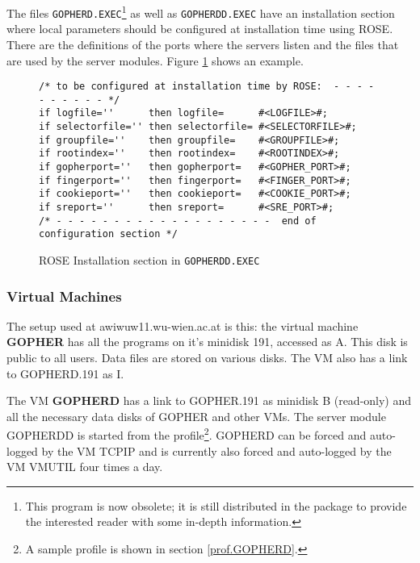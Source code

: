   The files {\tt GOPHERD.EXEC}\footnote{This program is now obsolete;
  it is still distributed in the package to provide the interested
  reader with some in-depth information.} as well as {\tt GOPHERDD.EXEC}
  have an installation
  section where local parameters should be configured at installation
  time using ROSE.
  There are the definitions of the ports where the servers listen
  and the files that are used by the server modules.
  Figure \ref{conf.gopherdd} shows an example.
 


\begin{figure}
\caption{ROSE Installation section in
{\tt GOPHERDD.EXEC}}\label{conf.gopherdd}
\rule{0mm}{2mm}
\begin{center}
\begin{small}
\begin{verbatim}
/* to be configured at installation time by ROSE:  - - - - - - - - - - */
if logfile=''      then logfile=      #<LOGFILE>#;
if selectorfile='' then selectorfile= #<SELECTORFILE>#;
if groupfile=''    then groupfile=    #<GROUPFILE>#;
if rootindex=''    then rootindex=    #<ROOTINDEX>#;
if gopherport=''   then gopherport=   #<GOPHER_PORT>#;
if fingerport=''   then fingerport=   #<FINGER_PORT>#;
if cookieport=''   then cookieport=   #<COOKIE_PORT>#;
if sreport=''      then sreport=      #<SRE_PORT>#;
/* - - - - - - - - - - - - - - - - - - -  end of configuration section */
\end{verbatim}
\end{small}
\end{center}
\rule{0mm}{2mm}
\end{figure}



\subsubsection{Virtual Machines}
  The setup used at {\sf awiwuw11.wu-wien.ac.at} is this:  
  the virtual machine {\bf GOPHER} has all the programs on it's minidisk 191,
  accessed as A.  This disk is public to all users.
  Data files are stored on various disks.
  The VM also has a link to GOPHERD.191 as I.

  The VM {\bf GOPHERD} has a link to GOPHER.191 as minidisk B (read-only)
  and all the necessary data disks of GOPHER and other VMs.
  The server module GOPHERDD is started from the profile\footnote{A sample
  profile is shown in section \ref{prof.GOPHERD}.}.  GOPHERD can be forced
  and auto-logged by the VM TCPIP and is currently also forced and
  auto-logged by the VM VMUTIL four times a day.

